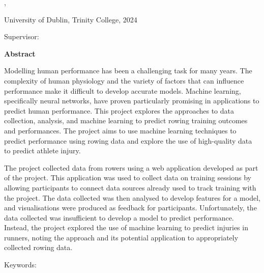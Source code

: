 \thispagestyle{plain}
\begin{center}
  \vspace{3cm}
  \textbf{\Huge\thesistitle}

  \thesissubtitle

  \authorname, \degree

  University of Dublin, Trinity College, 2024

  Supervisor: \supervisor

  \vspace{2cm}
  \textbf{Abstract}
\end{center}


Modelling human performance has been a challenging task for many years. The complexity of human physiology and the variety of factors that can influence performance make it difficult to develop accurate models. Machine learning, specifically neural networks, have proven particularly promising in applications to predict human performance. This project explores the approaches to data collection, analysis, and machine learning to predict rowing training outcomes and performances. The project aims to use machine learning techniques to predict performance using rowing data and explore the use of high-quality data to predict athlete injury. 

The project collected data from rowers using a web application developed as part of the project. This application was used to collect data on training sessions by allowing participants to connect data sources already used to track training with the project. The data collected was then analysed to develop features for a model, and visualisations were produced as feedback for participants. Unfortunately, the data collected was insufficient to develop a model to predict performance. Instead, the project explored the use of machine learning to predict injuries in runners, noting the approach and its potential application to appropriately collected rowing data.

Keywords: \keywords